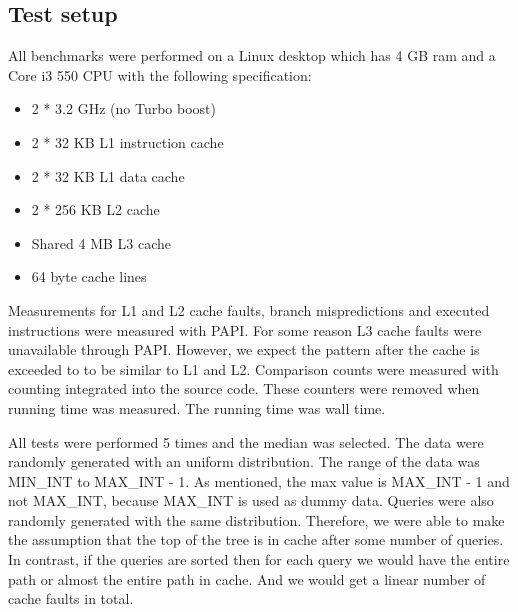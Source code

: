 \subsection{Test setup}

All benchmarks were performed on a Linux desktop which has 4 GB ram and a Core i3 550 CPU with the following specification:

\begin{itemize}
\item 2 * 3.2 GHz (no Turbo boost)
\item 2 * 32 KB L1 instruction cache
\item 2 * 32 KB L1 data cache
\item 2 * 256 KB L2 cache
\item Shared 4 MB L3 cache
\item 64 byte cache lines
\end{itemize}

Measurements for L1 and L2 cache faults, branch mispredictions and executed instructions were measured with PAPI. For some reason L3 cache faults were unavailable through PAPI. However, we expect the pattern after the cache is exceeded to  to be similar to L1 and L2. Comparison counts were measured with counting integrated into the source code. These counters were removed when running time was measured. The running time was wall time.


All tests were performed 5 times and the median was selected. The data were randomly generated with an uniform distribution. The range of the data was MIN\_INT to MAX\_INT - 1. As mentioned, the max value is MAX\_INT - 1 and not MAX\_INT, because MAX\_INT is used as dummy data. Queries were also randomly generated with the same distribution. Therefore, we were able to make the assumption that the top of the tree is in cache after some number of queries. In contrast, if the queries are sorted then for each query we would have the entire path or almost the entire path in cache. And we would get a linear number of cache faults in total.


